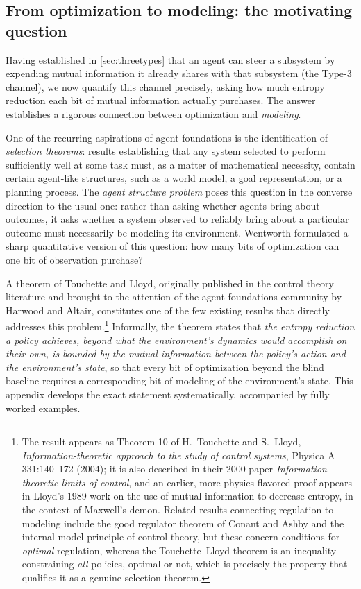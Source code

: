 \documentclass[11pt]{article}
\begin{document}
\subsection{From optimization to modeling: the motivating question}
\label{sec:tlquestion}

Having established in \cref{sec:threetypes} that an agent can steer a subsystem by expending mutual information it already shares with that subsystem (the Type-3 channel), we now quantify this channel precisely, asking how much entropy reduction each bit of mutual information actually purchases. The answer establishes a rigorous connection between optimization and \emph{modeling}.

One of the recurring aspirations of agent foundations is the identification of \emph{selection theorems}: results establishing that any system selected to perform sufficiently well at some task must, as a matter of mathematical necessity, contain certain agent-like structures, such as a world model, a goal representation, or a planning process. The \emph{agent structure problem} poses this question in the converse direction to the usual one: rather than asking whether agents bring about outcomes, it asks whether a system observed to reliably bring about a particular outcome must necessarily be modeling its environment. Wentworth formulated a sharp quantitative version of this question: how many bits of optimization can one bit of observation purchase?

A theorem of Touchette and Lloyd, originally published in the control theory literature and brought to the attention of the agent foundations community by Harwood and Altair, constitutes one of the few existing results that directly addresses this problem.\footnote{The result appears as Theorem 10 of H.~Touchette and S.~Lloyd, \emph{Information-theoretic approach to the study of control systems}, Physica A 331:140--172 (2004); it is also described in their 2000 paper \emph{Information-theoretic limits of control}, and an earlier, more physics-flavored proof appears in Lloyd's 1989 work on the use of mutual information to decrease entropy, in the context of Maxwell's demon. Related results connecting regulation to modeling include the good regulator theorem of Conant and Ashby and the internal model principle of control theory, but these concern conditions for \emph{optimal} regulation, whereas the Touchette--Lloyd theorem is an inequality constraining \emph{all} policies, optimal or not, which is precisely the property that qualifies it as a genuine selection theorem.} Informally, the theorem states that \emph{the entropy reduction a policy achieves, beyond what the environment's dynamics would accomplish on their own, is bounded by the mutual information between the policy's action and the environment's state}, so that every bit of optimization beyond the blind baseline requires a corresponding bit of modeling of the environment's state. This appendix develops the exact statement systematically, accompanied by fully worked examples.
\end{document}
